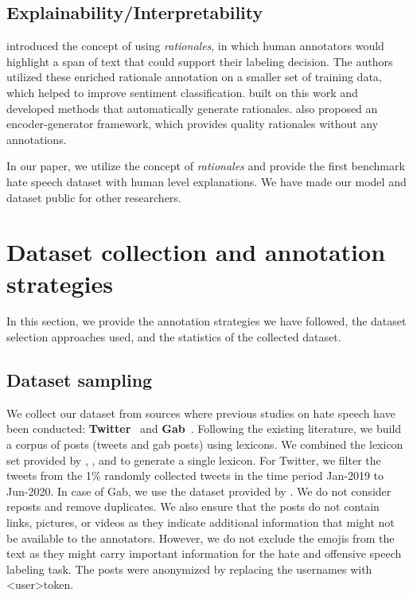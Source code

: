 \documentclass[letterpaper]{article} \usepackage{aaai21}  \usepackage{times}  \usepackage{helvet} \usepackage{courier}  \usepackage[hyphens]{url}  \usepackage{graphicx} \urlstyle{rm} \def\UrlFont{\rm}  \usepackage{natbib}  \usepackage{caption}
\begin{document}
\subsection{Explainability/Interpretability}

\citet{zaidan2007using} introduced the concept of using \textit{rationales}, in which human annotators would highlight a span of text that could support their labeling decision. The authors utilized these enriched rationale annotation on a smaller set of training data, which helped to improve sentiment classification. \citet{yessenalina2010automatically} built on this work and developed methods that automatically generate rationales. \citet{lei2016rationalizing} also proposed an encoder-generator framework, which provides quality rationales without any annotations. 



In our paper, we utilize the concept of \textit{rationales} and provide the first benchmark hate speech dataset with human level explanations. 
We have made our model and dataset public for other researchers.






\section{Dataset collection and annotation strategies}
In this section, we provide the annotation strategies we have followed, the dataset selection approaches used, and the statistics of the collected dataset.


\subsection{Dataset sampling}

We collect our dataset from sources where previous studies on hate speech have been conducted: \textbf{Twitter}~\cite{davidson2017automated,fortuna2018survey} and \textbf{Gab}~\cite{lima2018inside,mathew2020hatebegets,zannettou2018gab}. Following the existing literature, we build a corpus of posts (tweets and gab posts) using lexicons. We combined the lexicon set provided by \citet{davidson2017automated}, \citet{ousidhoum2019multilingual}, and \citet{mathew2019spread} to generate a single lexicon. For Twitter, we filter the tweets from the 1\% randomly collected tweets in the time period Jan-2019 to Jun-2020. In case of Gab, we use the dataset provided by \citet{mathew2019spread}.  We do not consider reposts and remove duplicates. We also ensure that the posts do not contain links, pictures, or videos as they indicate additional information that might not be available to the annotators. However, we do not exclude the emojis from the text as they might carry important information for the hate and offensive speech labeling task. The posts were anonymized by replacing the usernames with \textless user\textgreater token. 
\end{document}
